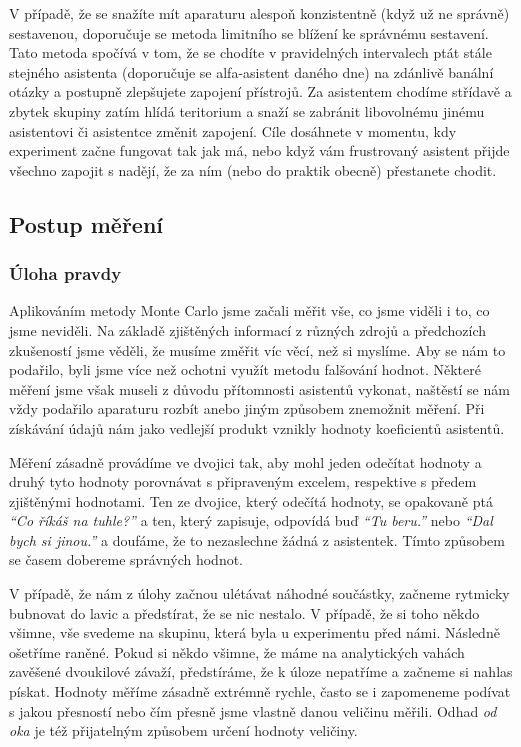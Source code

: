 \documentclass[english]{article}
\begin{document}
V případě, že se snažíte mít aparaturu alespoň konzistentně (když už ne správně) sestavenou, doporučuje se metoda limitního se blížení ke správnému sestavení. Tato metoda spočívá v tom, že se chodíte v pravidelných intervalech ptát stále stejného asistenta (doporučuje se alfa-asistent daného dne) na zdánlivě banální otázky a postupně zlepšujete zapojení přístrojů. Za asistentem chodíme střídavě a zbytek skupiny zatím hlídá teritorium a snaží se zabránit libovolnému jinému asistentovi či asistentce změnit zapojení. Cíle dosáhnete v momentu, kdy experiment začne fungovat tak jak má, nebo když vám frustrovaný asistent přijde všechno zapojit s nadějí, že za ním (nebo do praktik obecně) přestanete chodit.
\subsection{Postup měření}
\subsubsection{Úloha pravdy}
	 	 	
Aplikováním metody Monte Carlo jsme začali měřit vše, co jsme viděli i to, co jsme neviděli. Na základě zjištěných informací z různých zdrojů \cite{bib:vymyslene_tabulky} a předchozích zkušeností jsme věděli, že musíme změřit víc věcí, než si myslíme. Aby se nám to podařilo, byli jsme více než ochotni využít metodu falšování hodnot. Některé měření jsme však museli z důvodu přítomnosti asistentů vykonat, naštěstí se nám vždy podařilo aparaturu rozbít anebo jiným způsobem znemožnit měření. Při získávání údajů nám jako vedlejší produkt vznikly hodnoty koeficientů asistentů.

Měření zásadně provádíme ve dvojici tak, aby mohl jeden odečítat hodnoty a druhý tyto hodnoty porovnávat s připraveným excelem, respektive s předem zjištěnými hodnotami. Ten ze dvojice, který odečítá hodnoty, se opakovaně ptá \emph{“Co říkáš na tuhle?”} a ten, který zapisuje, odpovídá buď \emph{“Tu beru.”} nebo \emph{“Dal bych si jinou.”} a doufáme, že to nezaslechne žádná z asistentek. Tímto způsobem se časem dobereme správných hodnot. 

V případě, že nám z úlohy začnou ulétávat náhodné součástky, začneme rytmicky bubnovat do lavic a předstírat, že se nic nestalo. V případě, že si toho někdo všimne, vše svedeme na skupinu, která byla u experimentu před námi. Následně ošetříme raněné. Pokud si někdo všimne, že máme na analytických vahách zavěšené dvoukilové závaží, předstíráme, že k úloze nepatříme a začneme si nahlas pískat. Hodnoty měříme zásadně extrémně rychle, často se i zapomeneme podívat s jakou přesností nebo čím přesně jsme vlastně danou veličinu měřili. Odhad \emph{od oka} je též přijatelným způsobem určení hodnoty veličiny.
\end{document}
